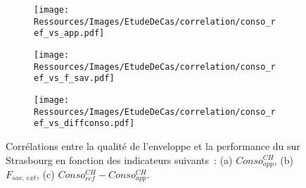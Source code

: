 \begin{figure}
    \centering
    \begin{subfigure}[b]{0.313\textwidth}
        \centering
        \texttt{[image: Ressources/Images/EtudeDeCas/correlation/conso\_ref\_vs\_app.pdf]}
        \caption{}
        \label{fig:conso_ref_vs_app}
    \end{subfigure}
    \quad
    \begin{subfigure}[b]{0.313\textwidth}
        \centering
        \texttt{[image: Ressources/Images/EtudeDeCas/correlation/conso\_ref\_vs\_f\_sav.pdf]}
        \caption{}
        \label{fig:conso_ref_vs_f_sav}
    \end{subfigure}
    \quad
    \begin{subfigure}[b]{0.313\textwidth}
        \centering
        \texttt{[image: Ressources/Images/EtudeDeCas/correlation/conso\_ref\_vs\_diffconso.pdf]}
        \caption{}
        \label{fig:conso_ref_vs_diffconso}
    \end{subfigure}
    \caption[Corrélation entre la qualité de l’enveloppe et la performance du  sur Strasbourg]
             {Corrélations entre la qualité de l’enveloppe et la performance du 
              sur Strasbourg en fonction des indicateurs suivants~: (a) $Conso_{app}^{CH}$, (b) $F_{sav,\, ext}$,
              (c) $Conso_{ref}^{CH} - Conso_{app}^{CH}$.}
    \label{fig:conso_ref_vs_app_f_sav}
\end{figure}



